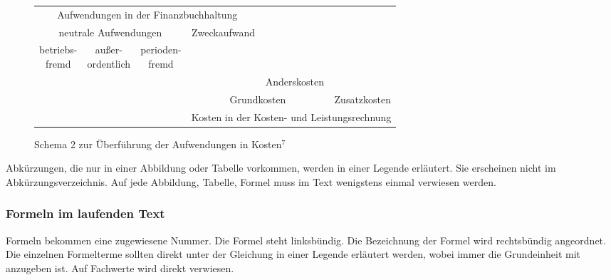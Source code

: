 \begin{figure}[H]
    \small
    \begin{tabularx}{\columnwidth}{cccccc}
        \cline{1-4}
        \multicolumn{4}{|c|}{Aufwendungen in der Finanzbuchhaltung} & & \\
        \cline{1-4}
        \multicolumn{3}{|c|}{neutrale Aufwendungen} & \multicolumn{1}{c|}{\multirow{3}{*}{Zweckaufwand}} & \\
        \multicolumn{1}{|c}{\multirow{2}{*}{\parbox{2cm}{betriebs-\\fremd}}} & \multicolumn{1}{|c}{\multirow{2}{*}{\parbox{2cm}{außer-\\ordentlich}}} & \multicolumn{1}{|c}{\multirow{2}{*}{\parbox{2cm}{perioden-\\fremd}}} & \multicolumn{1}{|c|}{\multirow{2}{*}{}} & & \\
        \multicolumn{1}{|c}{} & \multicolumn{1}{|c}{} & \multicolumn{1}{|c|}{} & \multicolumn{1}{c|}{} & & \\
        \cline{1-6}
        & & & \multicolumn{1}{|c}{} & \multicolumn{1}{|c|}{Anderskosten} &\multicolumn{1}{c|}{} \\
        \cline{5-5}
        & & & \multicolumn{2}{|c|}{Grundkosten} &  \multicolumn{1}{|c|}{Zusatzkosten} \\
        \cline{4-6}
        & & & \multicolumn{3}{|c|}{Kosten in der Kosten- und Leistungsrechnung}\\
        \cline{4-6}
    \end{tabularx}
    \normalsize
    \caption{\small Schema 2 zur Überführung der Aufwendungen in Kosten$^7$\normalsize}
    \label{fig-schema2}
\end{figure}

Abkürzungen, die nur in einer Abbildung oder Tabelle vorkommen, werden in einer Legende erläutert.
Sie erscheinen nicht im Abkürzungsverzeichnis.
Auf jede Abbildung, Tabelle, Formel muss im Text wenigstens einmal verwiesen werden.

\subsubsection{Formeln im laufenden Text}
\label{formal-gestaltung-textteil-formeln-fliesstext}
Formeln bekommen eine zugewiesene Nummer.
Die Formel steht linksbündig.
Die Bezeichnung der Formel wird rechtsbündig angeordnet.
Die einzelnen Formelterme sollten direkt unter der Gleichung in einer Legende erläutert werden, wobei immer die Grundeinheit mit anzugeben ist.
Auf Fachwerte wird direkt verwiesen.

